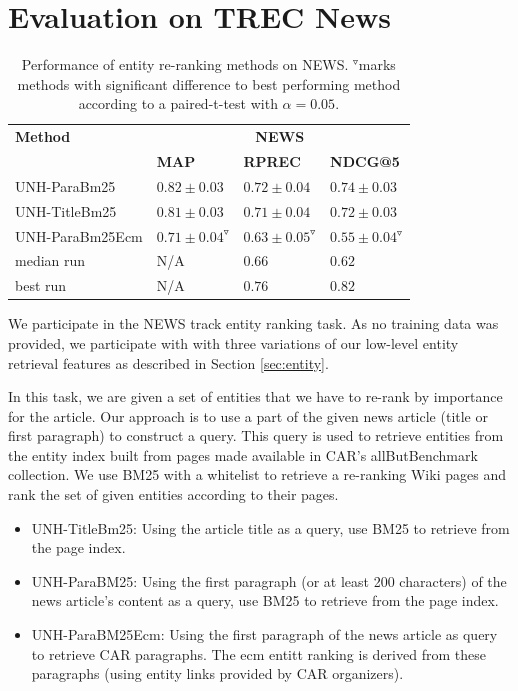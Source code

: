 \documentclass{article}
\begin{document}
\FloatBarrier



\section{Evaluation on TREC News}


\begin{table}
\centering \caption{Performance of entity re-ranking methods on NEWS. $^{\triangledown}$marks
methods with significant difference to best performing method according
to a paired-t-test with $\alpha=0.05$.\label{tab:news-results}}
\begin{tabular}{llll}
\toprule 
\textbf{Method}  & \multicolumn{3}{c}{\textbf{NEWS}}\tabularnewline
\cmidrule(lr){2-4}  & \textbf{MAP}  & \textbf{RPREC}  & \textbf{NDCG@5} \tabularnewline
UNH-ParaBm25 & $0.82\pm0.03$ & $0.72\pm0.04$ & $0.74\pm0.03$\tabularnewline
UNH-TitleBm25 & $0.81\pm0.03$ & $0.71\pm0.04$ & $0.72\pm0.03$\tabularnewline
UNH-ParaBm25Ecm & $0.71\pm0.04^{\triangledown}$ & $0.63\pm0.05^{\triangledown}$ & $0.55\pm0.04{}^{\triangledown}$\tabularnewline
\cmidrule(lr){2-4} 
median run & N/A & $0.66$ & $0.62$\tabularnewline
best run & N/A & $0.76$ & $0.82$\tabularnewline
\bottomrule
\end{tabular}

\end{table}

We participate in the NEWS track entity ranking task. As no training data was provided, we participate with with three variations of our low-level entity retrieval features as described in Section \ref{sec:entity}.

In this task, we are given a set of entities that we have to re-rank by importance for the article. Our approach is to use a part of the given news article (title or first paragraph) to construct a query. This query is used to retrieve entities from the entity index built from pages made available in CAR's allButBenchmark collection. We use BM25 with a whitelist to retrieve a re-ranking Wiki pages and rank the set of given entities according to their pages.

\begin{itemize}
    \item UNH-TitleBm25: Using the article title as a query, use BM25 to retrieve from the page index.  
    \item UNH-ParaBM25: Using the first paragraph (or at least 200 characters) of the news article's content as a query,  use BM25 to retrieve from the page index.  
    \item UNH-ParaBM25Ecm:  Using the first paragraph of the news article as query to retrieve CAR paragraphs. The ecm entitt ranking is derived from these paragraphs (using entity links provided by CAR organizers).
\end{itemize}
\end{document}
